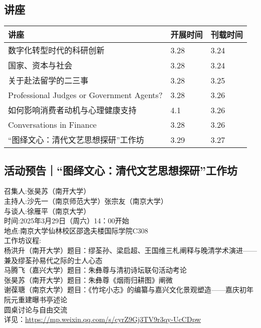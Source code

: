 \documentclass[letterpaper, 12pt]{article}
\begin{document}
\begin{multicols}{2}
\pagebreak

\section{讲座}
\begin{tabular}{|>{\centering\arraybackslash}m{}|m{}|m{}|}
    \hline
    讲座 & 开展时间 & 刊载时间\\
    \hline\hline
    数字化转型时代的科研创新 & 3.28 & 3.24\\\hline
    国家、资本与社会 & 3.28 & 3.24\\\hline
    关于赴法留学的二三事 & 3.28 & 3.25\\\hline
    Professional Judges or Government Agents? & 3.28 & 3.26\\\hline
    如何影响消费者动机与心理健康支持 & 4.1 & 3.26\\\hline
    Conversations in Finance & 3.28 & 3.26\\\hline
    “图绎文心：清代文艺思想探研”工作坊 & 3.29 & 3.27\\\hline
\end{tabular}

\subsection{活动预告｜“图绎文心：清代文艺思想探研”工作坊}
召集人:张昊苏（南开大学）
\\主持人:沙先一（南京师范大学）张宗友（南京大学）
\\与谈人:徐雁平（南京大学）
\\时间:2025年3月29日（周六）14：00开始
\\地点:南京大学仙林校区邵逸夫楼国际学院C308
\\工作坊议程:
\\杨洪升（南开大学）题目：缪荃孙、梁启超、王国维三札阐释与晚清学术演进——兼及缪荃孙易代之际的士人心态
\\马腾飞（嘉兴大学）题目：朱彝尊与清初诗坛联句活动考论
\\张昊苏（南开大学）题目：朱彝尊《烟雨归耕图》阐微
\\谢葆瑭（南京大学）题目：《竹垞小志》的编纂与嘉兴文化景观塑造——嘉庆初年阮元重建曝书亭述论
\\圆桌讨论与自由交流
\\详见：\url{https://mp.weixin.qq.com/s/cyrZ9Gj3TV9r3qy-UcCDpw}



\end{multicols}
\end{document}
